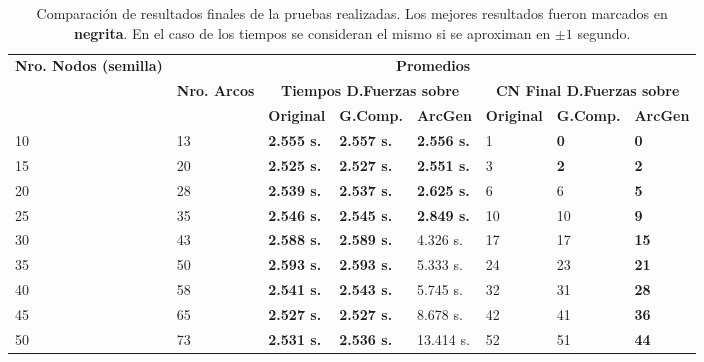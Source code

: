 \begin{table}[H]
	\caption{Comparación de resultados finales de la pruebas realizadas. Los mejores resultados fueron marcados en \textbf{negrita}. En el caso de los tiempos se consideran el mismo si se aproximan en $\pm1$ segundo.}
	\label{tab:resultados_comparacion}
	\begin{tabularx}{\linewidth}{|X|X|X|X|X|X|X|X|}
		\hline
		\multirow{3}{2cm}{\textbf{Nro. Nodos (semilla)}} & \multicolumn{7}{c|}{\textbf{Promedios}} \\
        \cline{2-8} & \multirow{2}{2cm}{\textbf{Nro. Arcos}} & \multicolumn{3}{c|}{\textbf{Tiempos D.Fuerzas sobre}} & \multicolumn{3}{c|}{\textbf{CN Final D.Fuerzas sobre}} \\
		\cline{3-8} & & \textbf{Original} & \textbf{G.Comp.} & \textbf{ArcGen} & \textbf{Original} & \textbf{G.Comp.} & \textbf{ArcGen} \\
		\hline
		10 & 13 & \textbf{2.555 s.} & \textbf{2.557 s.} & \textbf{2.556 s.} & {1} & \textbf{0} & \textbf{0} \\
		\hline
		15 & 20 & \textbf{2.525 s.} & \textbf{2.527 s.} & \textbf{2.551 s.} & {3} & \textbf{2} & \textbf{2} \\
		\hline
		20 & 28 & \textbf{2.539 s.} & \textbf{2.537 s.} & \textbf{2.625 s.} & {6} & {6} & \textbf{5} \\
		\hline
		25 & 35 & \textbf{2.546 s.} & \textbf{2.545 s.} & \textbf{2.849 s.} & {10} & {10} & \textbf{9} \\
		\hline
		30 & 43 & \textbf{2.588 s.} & \textbf{2.589 s.} & {4.326 s.} & {17} & {17} & \textbf{15} \\
		\hline
		35 & 50 & \textbf{2.593 s.} & \textbf{2.593 s.} & {5.333 s.} & {24} & {23} & \textbf{21} \\
		\hline
		40 & 58 & \textbf{2.541 s.} & \textbf{2.543 s.} & {5.745 s.} & {32} & {31} & \textbf{28} \\
		\hline
		45 & 65 & \textbf{2.527 s.} & \textbf{2.527 s.} & {8.678 s.} & {42} & {41} & \textbf{36} \\
		\hline
		50 & 73 & \textbf{2.531 s.} & \textbf{2.536 s.} & {13.414 s.} & {52} & {51} & \textbf{44} \\
		\hline
	\end{tabularx}
\end{table}



